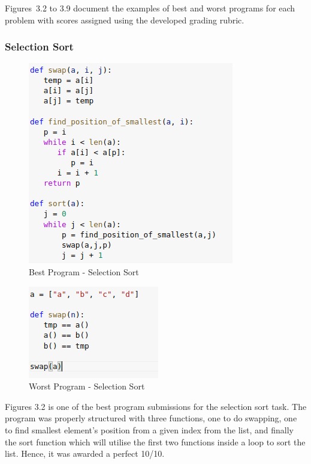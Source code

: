 Figures~3.2 to 3.9 document the examples of best and worst
programs for each problem with scores assigned using the
developed grading rubric.

\subsubsection{Selection Sort}

\begin{figure}[h]
\centering
\includegraphics[]{./figures/best_ss.png}
\caption{Best Program - Selection Sort}
\label{fig1}
\end{figure}

\begin{figure}[H]
\centering
\includegraphics[scale=1.2]{./figures/ss_worst.png}
\caption{Worst Program - Selection Sort}
\label{fig1}
\end{figure}


Figures 3.2 is one of the best program submissions for the
selection sort task. The program was properly structured with
three functions, one to do swapping, one to find smallest
element's position from a given index from the list, and
finally the sort function which will utilise the first two
functions inside a loop to sort the list. Hence, it was
awarded a perfect 10/10.

